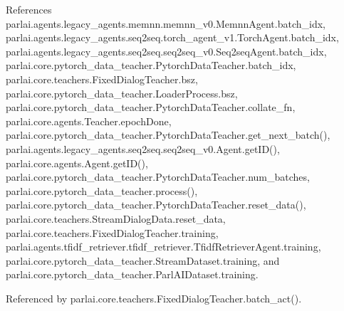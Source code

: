 References parlai.\+agents.\+legacy\+\_\+agents.\+memnn.\+memnn\+\_\+v0.\+Memnn\+Agent.\+batch\+\_\+idx, parlai.\+agents.\+legacy\+\_\+agents.\+seq2seq.\+torch\+\_\+agent\+\_\+v1.\+Torch\+Agent.\+batch\+\_\+idx, parlai.\+agents.\+legacy\+\_\+agents.\+seq2seq.\+seq2seq\+\_\+v0.\+Seq2seq\+Agent.\+batch\+\_\+idx, parlai.\+core.\+pytorch\+\_\+data\+\_\+teacher.\+Pytorch\+Data\+Teacher.\+batch\+\_\+idx, parlai.\+core.\+teachers.\+Fixed\+Dialog\+Teacher.\+bsz, parlai.\+core.\+pytorch\+\_\+data\+\_\+teacher.\+Loader\+Process.\+bsz, parlai.\+core.\+pytorch\+\_\+data\+\_\+teacher.\+Pytorch\+Data\+Teacher.\+collate\+\_\+fn, parlai.\+core.\+agents.\+Teacher.\+epoch\+Done, parlai.\+core.\+pytorch\+\_\+data\+\_\+teacher.\+Pytorch\+Data\+Teacher.\+get\+\_\+next\+\_\+batch(), parlai.\+agents.\+legacy\+\_\+agents.\+seq2seq.\+seq2seq\+\_\+v0.\+Agent.\+get\+I\+D(), parlai.\+core.\+agents.\+Agent.\+get\+I\+D(), parlai.\+core.\+pytorch\+\_\+data\+\_\+teacher.\+Pytorch\+Data\+Teacher.\+num\+\_\+batches, parlai.\+core.\+pytorch\+\_\+data\+\_\+teacher.\+process(), parlai.\+core.\+pytorch\+\_\+data\+\_\+teacher.\+Pytorch\+Data\+Teacher.\+reset\+\_\+data(), parlai.\+core.\+teachers.\+Stream\+Dialog\+Data.\+reset\+\_\+data, parlai.\+core.\+teachers.\+Fixed\+Dialog\+Teacher.\+training, parlai.\+agents.\+tfidf\+\_\+retriever.\+tfidf\+\_\+retriever.\+Tfidf\+Retriever\+Agent.\+training, parlai.\+core.\+pytorch\+\_\+data\+\_\+teacher.\+Stream\+Dataset.\+training, and parlai.\+core.\+pytorch\+\_\+data\+\_\+teacher.\+Parl\+A\+I\+Dataset.\+training.



Referenced by parlai.\+core.\+teachers.\+Fixed\+Dialog\+Teacher.\+batch\+\_\+act().

